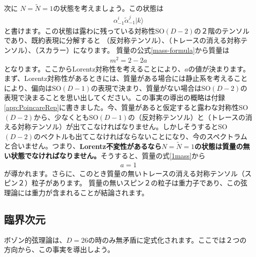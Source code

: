 \documentclass[report,paper=a4, fontsize=12pt, line_length=16cm, number_of_lines=34,dvipdfmx]{jlreq}
\numberwithin{equation}{chapter}
\numberwithin{equation}{section}
\newcommand{\kyou}[1]{{\sffamily \bfseries #1}}
\newcommand{\alphat}{\tilde{\alpha}}
\newcommand{\Nt}{\widetilde{N}}
\begin{document}
次に $N=\Nt=1$の状態を考えましょう。この状態は
\begin{align}
\alpha^i_{-1}\alphat^{j}_{-1}|k\rangle
\end{align}
と書けます。この状態は露わに残っている対称性SO$(D-2)$の２階のテンソルであり、既約表現に分解すると
（反対称テンソル）、（トレースの消える対称テンソル）、（スカラー）になります。
質量の公式\eqref{mass-formula}から質量は
\begin{align}
m^2=2-2a\label{1mass}
\end{align}
となります。ここからLorentz対称性を考えることにより、$a$の値が決まります。まず、Lorentz対称性があるときには、質量がある場合には静止系を考えることにより、偏向はSO$(D-1)$の表現で決まり、質量がない場合はSO$(D-2)$の表現で決まることを思い出してください。この事実の導出の概略は付録\ref{app:PoincareRep}に書きました。今、質量があると仮定すると露わな対称性SO$(D-2)$から、少なくともSO$(D-1)$の（反対称テンソル）と（トレースの消える対称テンソル）が出てこなければなりません。しかしそうするとSO$(D-2)$のベクトルも出てこなければならないことになり、今のスペクトラムと合いません。つまり、\kyou{Lorentz不変性があるなら$N=\Nt=1$の状態は質量の無い状態でなければなりません。}そうすると、質量の式\eqref{1mass}から
\begin{align}
a=1
\end{align}
が導かれます。さらに、このとき質量の無いトレースの消える対称テンソル（スピン２）粒子があります。
質量の無いスピン２の粒子は重力子であり、この弦理論には重力が含まれることが結論されます。

\subsection{臨界次元}
ボゾン的弦理論は、$D=26$の時のみ無矛盾に定式化されます。ここでは２つの方向から、この事実を導出しよう。
\end{document}
